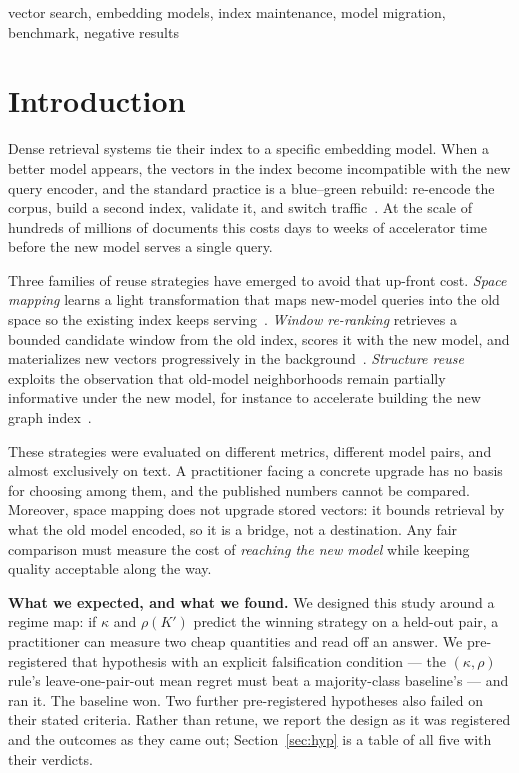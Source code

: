 \documentclass[conference]{IEEEtran}
\begin{document}
\begin{IEEEkeywords}
vector search, embedding models, index maintenance, model migration, benchmark,
negative results
\end{IEEEkeywords}

\section{Introduction}

Dense retrieval systems tie their index to a specific embedding model. When a better
model appears, the vectors in the index become incompatible with the new query
encoder, and the standard practice is a blue--green rebuild: re-encode the corpus,
build a second index, validate it, and switch traffic~\cite{zilliz-migration}. At the
scale of hundreds of millions of documents this costs days to weeks of accelerator
time before the new model serves a single query.

Three families of reuse strategies have emerged to avoid that up-front cost.
\emph{Space mapping} learns a light transformation that maps new-model queries into the
old space so the existing index keeps serving~\cite{drift-adapter}.
\emph{Window re-ranking} retrieves a bounded candidate window from the old index,
scores it with the new model, and materializes new vectors progressively in the
background~\cite{embedflow,thaw-anon}. \emph{Structure reuse} exploits the observation
that old-model neighborhoods remain partially informative under the new model, for
instance to accelerate building the new graph index~\cite{dgm}.

These strategies were evaluated on different metrics, different model pairs, and
almost exclusively on text. A practitioner facing a concrete upgrade has no basis for
choosing among them, and the published numbers cannot be compared. Moreover, space
mapping does not upgrade stored vectors: it bounds retrieval by what the old model
encoded, so it is a bridge, not a destination. Any fair comparison must measure the
cost of \emph{reaching the new model} while keeping quality acceptable along the way.

\textbf{What we expected, and what we found.} We designed this study around a regime
map: if $\kappa$ and $\rho(K')$ predict the winning strategy on a held-out pair, a
practitioner can measure two cheap quantities and read off an answer. We pre-registered
that hypothesis with an explicit falsification condition --- the $(\kappa,\rho)$ rule's
leave-one-pair-out mean regret must beat a majority-class baseline's --- and ran it.
The baseline won. Two further pre-registered hypotheses also failed on their stated
criteria. Rather than retune, we report the design as it was registered and the
outcomes as they came out; Section~\ref{sec:hyp} is a table of all five with their
verdicts.
\end{document}
